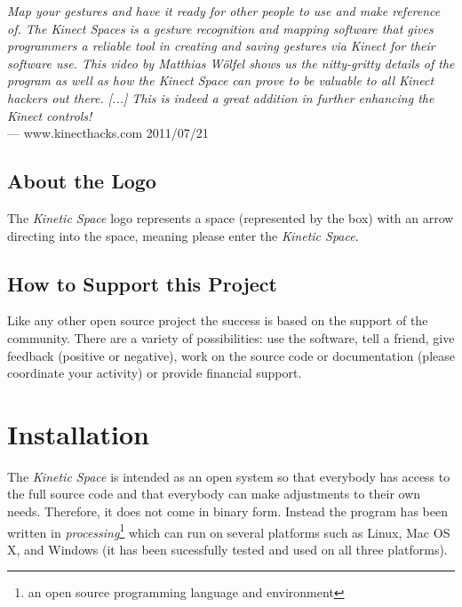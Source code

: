 \documentclass[titlepage,12pt,a4paper]{article}
\begin{document}
\emph{Map your gestures and have it ready for other people to use and make reference of. The Kinect Spaces is a gesture recognition and mapping software that gives programmers a reliable tool in creating and saving gestures via Kinect for their software use. This video by Matthias Wölfel shows us the nitty-gritty details of the program as well as how the Kinect Space can prove to be valuable to all Kinect hackers out there. [...] This is indeed a great addition in further enhancing the Kinect controls!}\\
--- www.kinecthacks.com 2011/07/21

\subsection{About the Logo}

The \emph{Kinetic Space} logo represents a space (represented by the box) with an arrow directing into the space, meaning please enter the \emph{Kinetic Space}.

\subsection{How to Support this Project}
Like any other open source project the success is based on the support of the community. There are a variety of possibilities: use the software, tell a friend, give feedback (positive or negative), work on the source code or documentation (please coordinate your activity) or provide financial support.

\newpage

 \section{Installation}

The \emph{Kinetic Space} is intended as an open system so that everybody has access to the full source code and that everybody can make adjustments to their own needs. Therefore, it does not come in binary form. Instead the program has been written in \emph{processing}\footnote{an open source programming language and environment} which can run on several platforms such as Linux, Mac OS X, and Windows (it has been sucessfully tested and used on all three platforms). 
\end{document}
